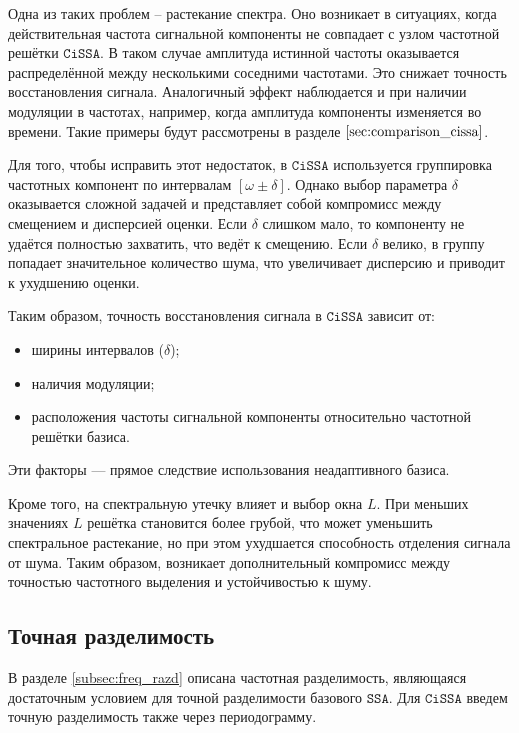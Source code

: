 \documentclass[12pt, specialist, subf
]{disser}
\theoremstyle{definition}
\newcommand{\SSA}{\texttt{SSA}}
\newcommand{\CISSA}{\texttt{CiSSA}}
\begin{document}
Одна из таких проблем -- растекание спектра. Оно возникает в ситуациях, когда действительная частота сигнальной компоненты не совпадает с узлом частотной решётки $\CISSA$. В таком случае амплитуда истинной частоты оказывается распределённой между несколькими соседними частотами. Это снижает точность восстановления сигнала. Аналогичный эффект наблюдается и при наличии модуляции в частотах, например, когда амплитуда компоненты изменяется во времени. Такие примеры будут рассмотрены в разделе $\ref{sec:comparison_cissa}$.

Для того, чтобы исправить этот недостаток, в $\CISSA$ используется группировка частотных компонент по интервалам $[\omega \pm \delta]$. Однако выбор параметра $\delta$ оказывается сложной задачей и представляет собой компромисс между смещением и дисперсией оценки. Если $\delta$ слишком мало, то компоненту не удаётся полностью захватить, что ведёт к смещению. Если $\delta$ велико, в группу попадает значительное количество шума, что увеличивает дисперсию и приводит к ухудшению оценки.

Таким образом, точность восстановления сигнала в $\CISSA$ зависит от:
\begin{itemize}
  \item ширины интервалов ($\delta$);
  \item наличия модуляции;
  \item расположения частоты сигнальной компоненты относительно частотной решётки базиса.
\end{itemize}

Эти факторы — прямое следствие использования неадаптивного базиса.

Кроме того, на спектральную утечку влияет и выбор окна $L$. При меньших значениях $L$ решётка становится более грубой, что может уменьшить спектральное растекание, но при этом ухудшается способность отделения сигнала от шума. Таким образом, возникает дополнительный компромисс между точностью частотного выделения и устойчивостью к шуму.



\subsection{Точная разделимость}
\label{subsec:cissa_exact}

В разделе \ref{subsec:freq_razd} описана частотная разделимость, являющаяся достаточным условием для точной разделимости базового $\SSA$. Для $\CISSA$ введем точную разделимость также через периодограмму.
\end{document}
